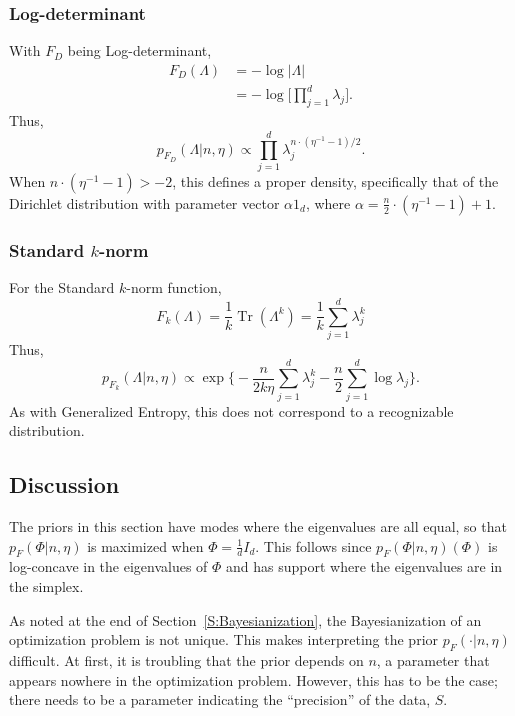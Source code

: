 \documentclass[12pt]{article}
\DeclareMathOperator*{\Tr}{Tr}
\theoremstyle{plain}
\begin{document}
\subsubsection*{Log-determinant}

With $F_D$ being Log-determinant,
\begin{align*}
    F_D(\Lambda)
        &= -\log |\Lambda| \\
        &= -\log \Big[ \prod_{j=1}^d \lambda_j \Big].
\end{align*}
Thus,
\[
    p_{F_D}(\Lambda | n, \eta)
        \propto
            \prod_{j=1}^d
                \lambda_j^{n \cdot (\eta^{-1} - 1)/2}.
\]
When $n \cdot (\eta^{-1} - 1) > -2$, this defines a proper density, specifically
that of the Dirichlet distribution with parameter vector $\alpha 1_d$, where
$\alpha = \tfrac{n}{2} \cdot (\eta^{-1} - 1) + 1$.


\subsubsection*{Standard $k$-norm}

For the Standard $k$-norm function,
\[
    F_k(\Lambda)
        = \frac{1}{k} \Tr(\Lambda^k)
        = \frac{1}{k} \sum_{j=1}^d \lambda_j^k
\]
Thus,
\[
    p_{F_k}(\Lambda | n, \eta)
        \propto
            \exp\Big\{
                -
                \frac{n}{2k \eta}
                \sum_{j=1}^{d} \lambda_j^k
                -
                \frac{n}{2}
                \sum_{j=1}^{d} \log \lambda_j
            \Big\}.
\]
As with Generalized Entropy, this does not correspond to a recognizable
distribution.


\subsection{Discussion}

The priors in this section have modes where the eigenvalues are all equal,
so that $p_F(\Phi|n, \eta)$ is maximized when $\Phi = \tfrac{1}{d} I_d$.  This
follows since $p_F(\Phi|n, \eta)(\Phi)$ is log-concave in the eigenvalues of
$\Phi$ and has support where the eigenvalues are in the simplex.

As noted at the end of Section~\ref{S:Bayesianization}, the Bayesianization of
an optimization problem is not unique.  This makes interpreting the prior
$p_F(\cdot | n, \eta)$ difficult.  At first, it is troubling that the prior
depends on $n$, a parameter that appears nowhere in the optimization problem.
However, this has to be the case; there needs to be a parameter indicating
the ``precision'' of the data, $S$.
\end{document}
